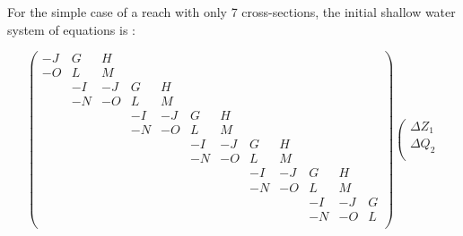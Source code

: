 \vspace{0.5cm}

For the simple case of a reach with only 7 cross-sections, the initial shallow water system of equations is :

\begin{equation}
    \left(
         \begin{array}{cccccccccccc}
          \scriptscriptstyle -J & \scriptscriptstyle G & \scriptscriptstyle H & & & & & & & & & \\
           \scriptscriptstyle -O & \scriptscriptstyle L & \scriptscriptstyle M & & & & & & & & & \\
              & \scriptscriptstyle -I & \scriptscriptstyle -J & \scriptscriptstyle G & \scriptscriptstyle H & & & & & & & \\
              & \scriptscriptstyle -N & \scriptscriptstyle -O & \scriptscriptstyle L & \scriptscriptstyle M & & & &  & & & \\
              & & & \scriptscriptstyle -I & \scriptscriptstyle -J & \scriptscriptstyle G & \scriptscriptstyle H & & & & & \\
              & & & \scriptscriptstyle -N & \scriptscriptstyle -O & \scriptscriptstyle L & \scriptscriptstyle M & & & & & \\
              & & & & & \scriptscriptstyle -I & \scriptscriptstyle -J & \scriptscriptstyle G & \scriptscriptstyle H & & & \\
              & & & & & \scriptscriptstyle -N & \scriptscriptstyle -O & \scriptscriptstyle L & \scriptscriptstyle M & & & \\
              & & & & & & & \scriptscriptstyle -I & \scriptscriptstyle -J & \scriptscriptstyle G & \scriptscriptstyle H & \\
              & & & & & & & \scriptscriptstyle -N & \scriptscriptstyle -O & \scriptscriptstyle L & \scriptscriptstyle M & \\
              & & & & & & & & & \scriptscriptstyle -I & \scriptscriptstyle -J & \scriptscriptstyle G \\
              & & & & & & & & & \scriptscriptstyle -N & \scriptscriptstyle -O & \scriptscriptstyle L \\
         \end{array}
    \right)
    \left(
            \begin{array}{c}
               \scriptscriptstyle \Delta Z_1\\
               \scriptscriptstyle \Delta Q_2\\

\end{array}
\end{equation}
